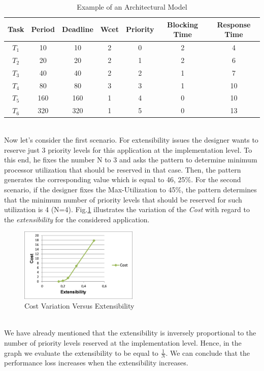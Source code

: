\documentclass[runningheads,a4paper]{llncs}
\begin{document}
\begin{table}[h]
\caption{Example of an Architectural Model}
\label{table3}
\centering
   \begin{tabular}{ | c || c || c || c || c || c || c |}
     \hline
     Task  & Period  & Deadline  &	Wcet &	Priority  &	Blocking Time  &	Response Time  \\
     \hline
     $T_1$ & 10 &	10&	2&	0&	2&	4 \\
     \hline
     $T_2$	&20&	20&	2&	1&	2&	6 \\
     \hline
     $T_3$	&40&	40&	2&	2&	1&	7\\
     \hline
     $T_4$	&80	&80	&3	&3	&1	&10 \\
     \hline
     $T_5$	&160	&160	&1	&4	&0	&10 \\
      \hline
     $T_6$	&320&	320&	1&	5&	0&	13 \\
     \hline
   \end{tabular}
\end{table}  
\\Now let's consider the first scenario. For extensibility issues the designer wants to reserve just 3 priority levels for this application at the implementation level. To this end, he fixes the number N to 3 and asks the pattern to determine minimum processor utilization that should be reserved in that case. Then, the pattern generates the corresponding value which is equal to 46, 25\%.  For the second scenario, if the designer fixes the Max-Utilization to 45\%, the pattern determines that the minimum number of priority levels that should be reserved for such utilization is 4 (N=4).  
Fig.\ref{extensibility} illustrates the variation of the \emph{Cost} with regard to the \emph{extensibility }for the considered application.  
\begin{figure}
\centering
\includegraphics[height=3.5cm]{Pic/extensibility}
\caption{Cost Variation Versus Extensibility}
\label{extensibility}
\end{figure}
\\We have already mentioned that the extensibility is inversely proportional to the number of priority levels reserved at the implementation level. Hence, in the graph we evaluate the extensibility to be equal to $\frac{1}{N}$. We can conclude that the performance loss increases when the extensibility increases. 
\end{document}
